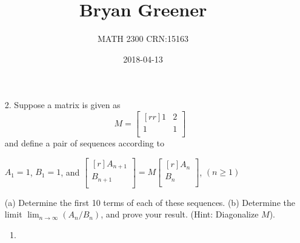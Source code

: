 \documentclass[12pt]{article}
\title{Bryan Greener}
\author{MATH 2300 CRN:15163}
\date{2018-04-13}
\theoremstyle{definition}
\theoremstyle{plain}
\begin{document}
\maketitle

\TabPositions{4cm}

\begin{enumerate}
\item[2.]Suppose a matrix is given as
\[ M=\begin{bmatrix}[rr]1&2\\1&1\\\end{bmatrix} \]
and define a pair of sequences according to
\begin{center}
$A_1=1$, $B_1=1$, and $\begin{bmatrix}[r]A_{n+1}\\B_{n+1}\\\end{bmatrix}=M\begin{bmatrix}[r]A_n\\B_n\\\end{bmatrix}$, $(n\geq 1)$
\end{center}
(a) Determine the first 10 terms of each of these sequences. (b) Determine the limit $\lim_{n\rightarrow\infty}(A_n/B_n)$, and prove your result. (Hint: Diagonalize $M$).
\begin{enumerate}
\item

\end{enumerate}
\end{enumerate}
\end{document}
